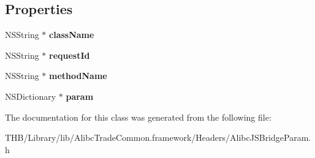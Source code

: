 \subsection*{Properties}
\begin{DoxyCompactItemize}
\item 
\mbox{\label{interface_alibc_j_s_bridge_param_af8457033d9cc633cc614310d950fd026}} 
N\+S\+String $\ast$ {\bfseries class\+Name}
\item 
\mbox{\label{interface_alibc_j_s_bridge_param_a5a9e8d1b0ad79fb3f48c467bc52c714c}} 
N\+S\+String $\ast$ {\bfseries request\+Id}
\item 
\mbox{\label{interface_alibc_j_s_bridge_param_ab64d28b30d11c3f0fe2a5388441b6592}} 
N\+S\+String $\ast$ {\bfseries method\+Name}
\item 
\mbox{\label{interface_alibc_j_s_bridge_param_aa118004cb466fb006138124855b6ec5f}} 
N\+S\+Dictionary $\ast$ {\bfseries param}
\end{DoxyCompactItemize}


The documentation for this class was generated from the following file\+:\begin{DoxyCompactItemize}
\item 
T\+H\+B/\+Library/lib/\+Alibc\+Trade\+Common.\+framework/\+Headers/Alibc\+J\+S\+Bridge\+Param.\+h\end{DoxyCompactItemize}
